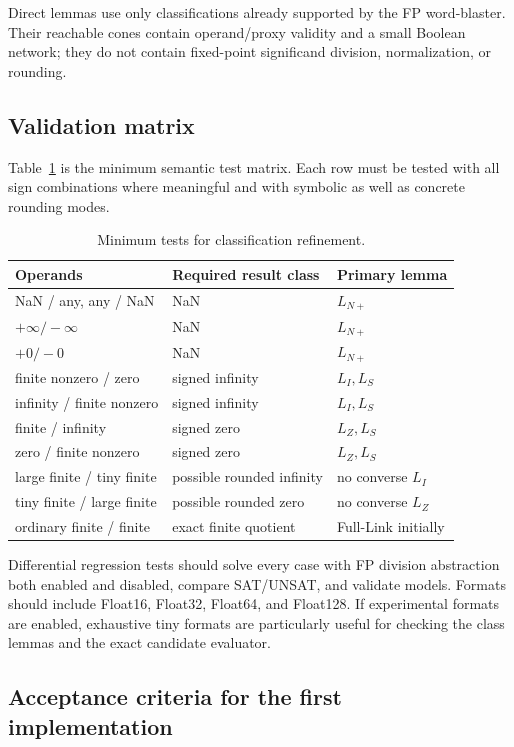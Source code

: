 \documentclass[runningheads]{llncs}
\begin{document}
Direct lemmas use only classifications already supported by the FP
word-blaster.  Their reachable cones contain operand/proxy validity and a
small Boolean network; they do not contain fixed-point significand division,
normalization, or rounding.

\subsection{Validation matrix}

Table~\ref{tab:matrix} is the minimum semantic test matrix.  Each row must be
tested with all sign combinations where meaningful and with symbolic as well
as concrete rounding modes.

\begin{table}[t]
\centering
\caption{Minimum tests for classification refinement.}
\label{tab:matrix}
\small
\begin{tabular}{lll}
\toprule
Operands & Required result class & Primary lemma \\
\midrule
NaN / any, any / NaN & NaN & \(L_{N+}\) \\
\(+\infty/-\infty\) & NaN & \(L_{N+}\) \\
\(+0/-0\) & NaN & \(L_{N+}\) \\
finite nonzero / zero & signed infinity & \(L_I,L_S\) \\
infinity / finite nonzero & signed infinity & \(L_I,L_S\) \\
finite / infinity & signed zero & \(L_Z,L_S\) \\
zero / finite nonzero & signed zero & \(L_Z,L_S\) \\
large finite / tiny finite & possible rounded infinity & no converse \(L_I\) \\
tiny finite / large finite & possible rounded zero & no converse \(L_Z\) \\
ordinary finite / finite & exact finite quotient & Full-Link initially \\
\bottomrule
\end{tabular}
\end{table}

Differential regression tests should solve every case with FP division
abstraction both enabled and disabled, compare SAT/UNSAT, and validate models.
Formats should include Float16, Float32, Float64, and Float128.  If experimental
formats are enabled, exhaustive tiny formats are particularly useful for
checking the class lemmas and the exact candidate evaluator.

\subsection{Acceptance criteria for the first implementation}
\end{document}
